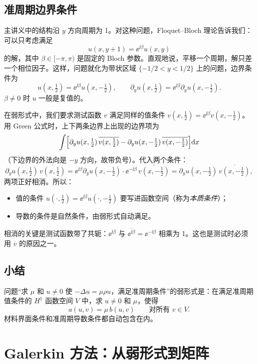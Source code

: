 \documentclass[11pt,a4paper,fontset=fandol]{ctexart}
\begin{document}
\subsection{准周期边界条件}
\label{sec:qp-weak}

主讲义中的结构沿 $y$ 方向周期为 1。对这种问题，Floquet--Bloch 理论告诉我们：可以只考虑满足
\begin{equation}
\label{eq:qp}
u(x,y+1)=\ee^{\ii\beta}u(x,y)
\end{equation}
的解，其中 $\beta\in[-\pi,\pi)$ 是固定的 Bloch 参数。直观地说，平移一个周期，解只差一个相位因子。这样，问题就化为带状区域 $\{-1/2<y<1/2\}$ 上的问题，边界条件为
\[
u(x,\tfrac12)=\ee^{\ii\beta}u(x,-\tfrac12),\qquad \partial_yu(x,\tfrac12)=\ee^{\ii\beta}\partial_yu(x,-\tfrac12).
\]
$\beta\ne0$ 时 $u$ 一般是复值的。

在弱形式中，我们要求测试函数 $v$ 满足同样的值条件 $v(x,\tfrac12)=\ee^{\ii\beta}v(x,-\tfrac12)$。用 Green 公式时，上下两条边界上出现的边界项为
\[
\int\Bigl[\partial_yu(x,\tfrac12)\,\overline{v(x,\tfrac12)}-\partial_yu(x,-\tfrac12)\,\overline{v(x,-\tfrac12)}\Bigr]\mathrm{d} x
\]
（下边界的外法向是 $-y$ 方向，故带负号）。代入两个条件：
\[
\partial_yu(x,\tfrac12)\,\overline{v(x,\tfrac12)}
=\ee^{\ii\beta}\partial_yu(x,-\tfrac12)\cdot\ee^{-\ii\beta}\,\overline{v(x,-\tfrac12)}
=\partial_yu(x,-\tfrac12)\,\overline{v(x,-\tfrac12)} ,
\]
两项正好相消。所以：
\begin{itemize}
\item 值的条件 $u(\cdot,\tfrac12)=\ee^{\ii\beta}u(\cdot,-\tfrac12)$ 要写进函数空间（称为\emph{本质条件}）；
\item 导数的条件是自然条件，由弱形式自动满足。
\end{itemize}
相消的关键是测试函数带了共轭：$\ee^{\ii\beta}$ 与 $\overline{\ee^{\ii\beta}}=\ee^{-\ii\beta}$ 相乘为 1。这也是测试时必须用 $\overline v$ 的原因之一。

\subsection{小结}

问题“求 $\mu$ 和 $u\ne0$ 使 $-\Delta u=\mu\rho u$，满足准周期条件”的弱形式是：在满足准周期值条件的 $H^1$ 函数空间 $V$ 中，求 $u\ne0$ 和 $\mu$，使得
\[
a(u,v)=\mu\,b(u,v)\qquad\text{对所有 }v\in V .
\]
材料界面条件和准周期导数条件都自动包含在内。

\section{Galerkin 方法：从弱形式到矩阵}
\label{sec:galerkin}
\end{document}
